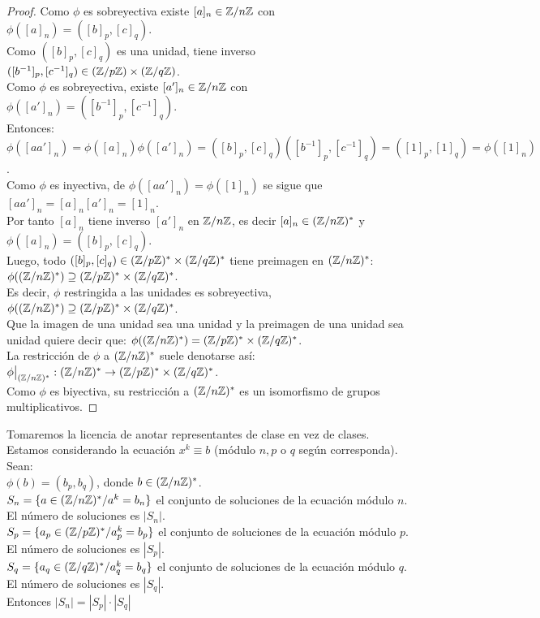 \begin{proof}
Como $\phi$ es sobreyectiva existe $[a]_n \in \mathbb{Z}/n\mathbb{Z}$ con $\phi([a]_n)=([b]_p,[c]_q)$. \\
Como $([b]_p,[c]_q)$ es una unidad, tiene inverso $([b^{-1}]_p,[c^{-1}]_q) \in (\mathbb{Z}/p\mathbb{Z}) \times (\mathbb{Z}/q\mathbb{Z})$. \\
Como $\phi$ es sobreyectiva, existe $[a']_n \in \mathbb{Z}/n\mathbb{Z}$ con $\phi([a']_n)=([b^{-1}]_p,[c^{-1}]_q)$. \\
Entonces: \\
$\phi([aa']_n) = \phi([a]_n)\phi([a']_n) = ([b]_p,[c]_q)([b^{-1}]_p,[c^{-1}]_q) = ([1]_p,[1]_q) = \phi([1]_n)$. \\
Como $\phi$ es inyectiva, de $\phi([aa']_n)=\phi([1]_n)$ se sigue que $[aa']_n = [a]_n[a']_n = [1]_n$. \\
Por tanto $[a]_n$ tiene inverso $[a']_n$ en $\mathbb{Z}/n\mathbb{Z}$, es decir $[a]_n \in (\mathbb{Z}/n\mathbb{Z})^{*}$ y $\phi([a]_n)=([b]_p,[c]_q)$. \\
Luego, todo $([b]_p,[c]_q)\in (\mathbb{Z}/p\mathbb{Z})^{*} \times (\mathbb{Z}/q\mathbb{Z})^{*}$ tiene preimagen en $(\mathbb{Z}/n\mathbb{Z})^{*}$: \\
$\phi((\mathbb{Z}/n\mathbb{Z})^{*})\supseteq (\mathbb{Z}/p\mathbb{Z})^{*} \times (\mathbb{Z}/q\mathbb{Z})^{*}$. \\
Es decir, $\phi$ restringida a las unidades es sobreyectiva,
$\phi((\mathbb{Z}/n\mathbb{Z})^{*})\supseteq (\mathbb{Z}/p\mathbb{Z})^{*} \times (\mathbb{Z}/q\mathbb{Z})^{*}$. \\
Que la imagen de una unidad sea una unidad y la preimagen de una unidad sea unidad quiere decir que: $\phi((\mathbb{Z}/n\mathbb{Z})^{*}) = (\mathbb{Z}/p\mathbb{Z})^{*} \times (\mathbb{Z}/q\mathbb{Z})^{*}$. \\
La restricción de $\phi$ a $(\mathbb{Z}/n\mathbb{Z})^{*}$ suele denotarse así: $\phi\big|_{(\mathbb{Z}/n\mathbb{Z})^{*}}: (\mathbb{Z}/n\mathbb{Z})^{*} \to (\mathbb{Z}/p\mathbb{Z})^{*} \times (\mathbb{Z}/q\mathbb{Z})^{*}$. \\
Como $\phi$ es biyectiva, su restricción a $(\mathbb{Z}/n\mathbb{Z})^{*}$ es un isomorfismo de grupos multiplicativos.
\end{proof}

\begin{enunciado} \label{enun:productosol}\leavevmode\par 
Tomaremos la licencia de anotar representantes de clase en vez de clases. \\
Estamos considerando la ecuación $x^k \equiv b$ (módulo $n,p$ o $q$ según corresponda). \\ 
Sean: \\
$\phi(b) = (b_p,b_q)$, donde $b \in (\mathbb{Z}/n\mathbb{Z})^*$. \\
$S_n=\{ a \in (\mathbb{Z}/n\mathbb{Z})^* / a^k=b_n \}$ el conjunto de soluciones de la ecuación módulo $n$. El número de soluciones es $|S_n|$.\\
$S_p=\{ a_p \in(\mathbb{Z}/p\mathbb{Z})^* / a_p^k=b_p \}$ el conjunto de soluciones de la ecuación módulo $p$. El número de soluciones es $|S_p|$. \\
$S_q=\{ a_q \in(\mathbb{Z}/q\mathbb{Z})^* / a_q^k=b_q \}$ el conjunto de soluciones de la ecuación módulo $q$. El número de soluciones es $|S_q|$.\\
Entonces $|S_n| = |S_p|\cdot|S_q|$
\end{enunciado}

